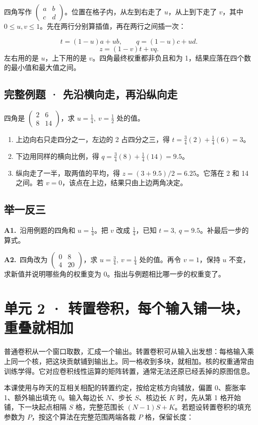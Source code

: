 \documentclass[UTF8,a4paper,11pt]{ctexart}
\newcommand{\PracticeQuestion}[3]{\par\Needspace{4\baselineskip}\noindent\begin{minipage}{\linewidth}\textbf{#1.}\ #2\par\noindent\rule{0pt}{#3mm}\par\end{minipage}\par}
\begin{document}
四角写作 $\begin{pmatrix}a&b\\c&d\end{pmatrix}$。位置在格子内，从左到右走了 $u$，从上到下走了 $v$，其中 $0\le u,v\le1$。先在两行分别算插值，再在两行之间插一次：

\[t=(1-u)a+ub,\qquad q=(1-u)c+ud.\]
\[z=(1-v)t+vq.\]
左右用的是 $u$，上下用的是 $v$。四角最终权重都非负且和为 1，结果应落在四个数的最小值和最大值之间。

\subsection{完整例题 · 先沿横向走，再沿纵向走}
四角是 $\begin{pmatrix}2&6\\8&14\end{pmatrix}$，求 $u=\frac14,\ v=\frac12$ 处的值。

\begin{enumerate}
\item 上边向右只走四分之一，左边的 2 占四分之三，得 $t=\frac34(2)+\frac14(6)=3$。
\item 下边用同样的横向比例，得 $q=\frac34(8)+\frac14(14)=9.5$。
\item 纵向走了一半，取两值的平均，得 $z=(3+9.5)/2=6.25$。它落在 2 和 14 之间。若 $v=0$，该点在上边，结果只由上边两角决定。
\end{enumerate}
\subsection{举一反三}
\PracticeQuestion{A1}{沿用例题的四角和 $u=\frac14$。把 $v$ 改成 $\frac14$，已知 $t=3,\ q=9.5$。补最后一步的算式。}{23}
\PracticeQuestion{A2}{四角改为 $\begin{pmatrix}0&8\\4&20\end{pmatrix}$，求 $u=\frac34,\ v=\frac14$ 处的值。再令 $v=1$，保持 $u$ 不变，求新值并说明哪些角的权重变为 0。指出与例题相比哪一步的权重变了。}{26}
\clearpage
\section{单元 2 · 转置卷积，每个输入铺一块，重叠就相加}
普通卷积从一个窗口取数，汇成一个输出。转置卷积可从输入出发想：每格输入乘上同一个核，把这块贡献铺到输出上。同一格收到多块，就相加。核的权重通常由训练学得。它对应卷积线性运算的矩阵转置，通常无法还原已经丢掉的原图信息。

本课使用与昨天的互相关相配的转置约定，按给定核方向铺放，偏置 0、膨胀率 1、额外输出填充 0。输入每边长 $N$、步长 $S$、核边长 $K$ 时，先从第 1 格开始铺，下一块起点相隔 $S$ 格，完整范围长 $(N-1)S+K$。若题设转置卷积的填充参数为 $P$，按这个算法在完整范围两端各裁 $P$ 格，保留长度：
\end{document}
